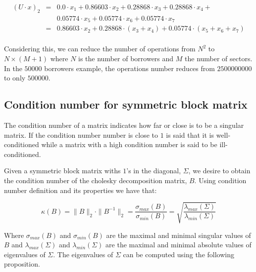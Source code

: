 \documentclass[a4paper,12pt,final]{article}
\begin{document}
\begin{displaymath}
\begin{array}{rcl}
(U \cdot x)_2 & = & 0.0 \cdot x_1 + 0.86603 \cdot x_2 + 0.28868 \cdot x_3 + 0.28868 \cdot x_4 +     \\
              &   & 0.05774 \cdot x_5 + 0.05774 \cdot x_6 + 0.05774 \cdot x_7                       \\
              & = & 0.86603 \cdot x_2 + 0.28868 \cdot (x_3 + x_4) + 0.05774 \cdot (x_5 + x_6 + x_7) \\
\end{array}
\end{displaymath}

Considering this, we can reduce the number of operations from $N^2$ to 
$N \times (M+1)$ where $N$ is the number of borrowers and $M$ the number of 
sectors. In the $50000$ borrowers example, the operations number reduces from 
$2500000000$ to only $500000$.

\subsection{Condition number for symmetric block matrix}
\label{ap:condnum}

The condition number of a matrix indicates how far or close is to be a singular 
matrix. If the condition number number is close to $1$ is said that it is 
well-conditioned while a matrix with a high condition number is said to be 
ill-conditioned.
\newline

Given a symmetric block matrix withs $1$'s in the diagonal, $\Sigma$, we desire 
to obtain the condition number of the cholesky decomposition matrix, $B$.
Using condition number definition and its properties we have that:

\begin{displaymath}
\kappa(B) = \|B\|_2 \cdot \|B^{-1}\|_2 
= \frac{\sigma_{max}(B)}{\sigma_{min}(B)}
= \sqrt{\frac{\lambda_{max}(\Sigma)}{\lambda_{min}(\Sigma)}}
\end{displaymath}

Where $\sigma_{max}(B)$ and $\sigma_{min}(B)$ are the maximal and minimal singular 
values of $B$ and $\lambda_{max}(\Sigma)$ and $\lambda_{min}(\Sigma)$ 
are the maximal and minimal absolute values of eigenvalues of $\Sigma$.
The eigenvalues of $\Sigma$ can be computed using the following proposition.
\end{document}
